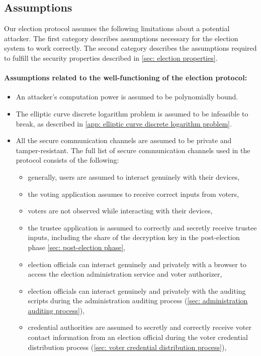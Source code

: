 \subsection{Assumptions} \label{sec: assumptions}
Our election protocol assumes the following limitations about a potential attacker. The first category describes assumptions necessary for the election system to work correctly. The second category describes the assumptions required to fulfill the security properties described in \cref{sec: election properties}.

\paragraph{Assumptions related to the well-functioning of the election protocol:}
\begin{itemize}
    \item An attacker's computation power is assumed to be polynomially bound. 
    \item The elliptic curve discrete logarithm problem is assumed to be infeasible to break, as described in \cref{app: elliptic curve discrete logarithm problem}.
    \item All the secure communication channels are assumed to be private and tamper-resistant. The full list of secure communication channels used in the protocol consists of the following:
    \begin{itemize}
        \item generally, users are assumed to interact genuinely with their devices,
        \item the voting application assumes to receive correct inputs from voters,
        \item voters are not observed while interacting with their devices,
        \item the trustee application is assumed to correctly and secretly receive trustee inputs, including the share of the decryption key in the post-election phase \cref{sec: post-election phase},
        \item election officials can interact genuinely and privately with a browser to access the election administration service and voter authorizer,
        \item election officials can interact genuinely and privately with the auditing scripts during the administration auditing process (\cref{sec: administration auditing process}),
        \item credential authorities are assumed to secretly and correctly receive voter contact information from an election official during the voter credential distribution process (\cref{sec: voter credential distribution process}),

\end{itemize}
\end{itemize}
